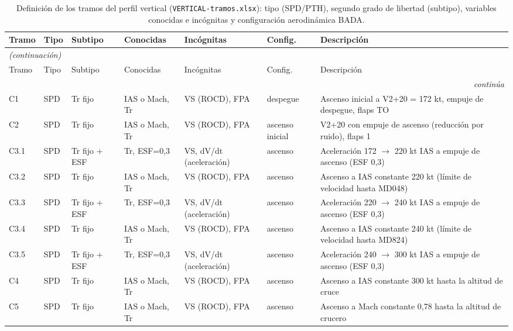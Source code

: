 \begingroup\scriptsize\setlength{\tabcolsep}{2.8pt}
\begin{longtable}{lll>{\raggedright\arraybackslash}p{2.5cm}ll>{\raggedright\arraybackslash}p{4.3cm}}
\caption{Definición de los tramos del perfil vertical (\texttt{VERTICAL-tramos.xlsx}): tipo (SPD/PTH), segundo grado de libertad (subtipo), variables conocidas e incógnitas y configuración aerodinámica BADA.}\label{tab:vdef}\\
\toprule
Tramo & Tipo & Subtipo & Conocidas & Incógnitas & Config. & Descripción\\
\midrule
\endfirsthead
\multicolumn{7}{l}{\small\itshape (continuación)}\\
\toprule
Tramo & Tipo & Subtipo & Conocidas & Incógnitas & Config. & Descripción\\
\midrule
\endhead
\midrule
\multicolumn{7}{r}{\small\itshape continúa}\\
\endfoot
\bottomrule
\endlastfoot
C1 & SPD & Tr fijo & IAS o Mach, Tr & VS (ROCD), FPA & despegue & \scriptsize Ascenso inicial a V2+20 = 172 kt, empuje de despegue, flaps TO\\
C2 & SPD & Tr fijo & IAS o Mach, Tr & VS (ROCD), FPA & ascenso inicial & \scriptsize V2+20 con empuje de ascenso (reducción por ruido), flaps 1\\
C3.1 & SPD & Tr fijo + ESF & Tr, ESF=0,3 & VS, dV/dt (aceleración) & ascenso & \scriptsize Aceleración 172 $\rightarrow$ 220 kt IAS a empuje de ascenso (ESF 0,3)\\
C3.2 & SPD & Tr fijo & IAS o Mach, Tr & VS (ROCD), FPA & ascenso & \scriptsize Ascenso a IAS constante 220 kt (límite de velocidad hasta MD048)\\
C3.3 & SPD & Tr fijo + ESF & Tr, ESF=0,3 & VS, dV/dt (aceleración) & ascenso & \scriptsize Aceleración 220 $\rightarrow$ 240 kt IAS a empuje de ascenso (ESF 0,3)\\
C3.4 & SPD & Tr fijo & IAS o Mach, Tr & VS (ROCD), FPA & ascenso & \scriptsize Ascenso a IAS constante 240 kt (límite de velocidad hasta MD824)\\
C3.5 & SPD & Tr fijo + ESF & Tr, ESF=0,3 & VS, dV/dt (aceleración) & ascenso & \scriptsize Aceleración 240 $\rightarrow$ 300 kt IAS a empuje de ascenso (ESF 0,3)\\
C4 & SPD & Tr fijo & IAS o Mach, Tr & VS (ROCD), FPA & ascenso & \scriptsize Ascenso a IAS constante 300 kt hasta la altitud de cruce\\
C5 & SPD & Tr fijo & IAS o Mach, Tr & VS (ROCD), FPA & ascenso & \scriptsize Ascenso a Mach constante 0,78 hasta la altitud de crucero\\

\end{longtable}
